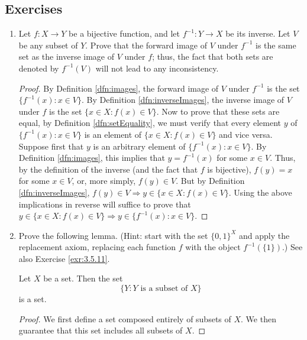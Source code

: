\documentclass[../main.tex]{subfiles}
\begin{document}
\subsection*{Exercises}
\begin{enumerate}[ref={\thesection.\arabic*}]
    \item \label{exr:3.4.1}Let $f:X\to Y$ be a bijective function, and let $f^{-1}:Y\to X$ be its inverse. Let $V$ be any subset of $Y$. Prove that the forward image of $V$ under $f^{-1}$ is the same set as the inverse image of $V$ under $f$; thus, the fact that both sets are denoted by $f^{-1}(V)$ will not lead to any inconsistency.
    \begin{proof}
        By Definition \ref{dfn:images}, the forward image of $V$ under $f^{-1}$ is the set $\{f^{-1}(x):x\in V\}$. By Definition \ref{dfn:inverseImages}, the inverse image of $V$ under $f$ is the set $\{x\in X:f(x)\in V\}$. Now to prove that these sets are equal, by Definition \ref{dfn:setEquality}, we must verify that every element $y$ of $\{f^{-1}(x):x\in V\}$ is an element of $\{x\in X:f(x)\in V\}$ and vice versa. Suppose first that $y$ is an arbitrary element of $\{f^{-1}(x):x\in V\}$. By Definition \ref{dfn:images}, this implies that $y=f^{-1}(x)$ for some $x\in V$. Thus, by the definition of the inverse (and the fact that $f$ is bijective), $f(y)=x$ for some $x\in V$, or, more simply, $f(y)\in V$. But by Definition \ref{dfn:inverseImages}, $f(y)\in V \Longrightarrow y\in\{x\in X:f(x)\in V\}$. Using the above implications in reverse will suffice to prove that $y\in\{x\in X:f(x)\in V\} \Longrightarrow y\in\{f^{-1}(x):x\in V\}$.
    \end{proof}
    \setcounter{enumi}{5}
    \item \label{exr:3.4.6}Prove the following lemma. (Hint: start with the set $\{0,1\}^X$ and apply the replacement axiom, replacing each function $f$ with the object $f^{-1}(\{1\})$.) See also Exercise \ref{exr:3.5.11}.
    \begin{lem}
        Let $X$ be a set. Then the set
        \begin{equation*}
            \{Y:Y\text{ is a subset of }X\}
        \end{equation*}
        is a set.
        \begin{proof}
            We first define a set composed entirely of subsets of $X$. We then guarantee that this set includes all subsets of $X$.\par

\end{proof}
\end{lem}
\end{enumerate}
\end{document}
